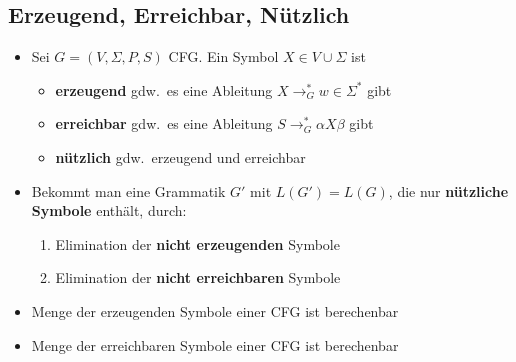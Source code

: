 \documentclass[ieeetran]{article}
\begin{document}
\subsection{Erzeugend, Erreichbar, Nützlich} %
\label{sub:erzeugend_erreichbar_nützlich}
\begin{itemize}
\item Sei $G = (V,\Sigma, P, S)$ CFG. Ein Symbol $X \in V \cup \Sigma$ ist
\begin{itemize}
\item \textbf{erzeugend} gdw.\ es eine Ableitung $X \rightarrow_G^* w \in \Sigma^*$ gibt
\item \textbf{erreichbar} gdw.\ es eine Ableitung $S \rightarrow_G^* \alpha X \beta$ gibt
  \item \textbf{nützlich} gdw.\ erzeugend und erreichbar


\end{itemize}

\item Bekommt man eine Grammatik $G'$ mit $L(G') = L(G)$, die nur \textbf{nützliche Symbole} enthält, durch:
	\begin{enumerate}
	  \item Elimination der \textbf{nicht erzeugenden} Symbole
\item Elimination der \textbf{nicht erreichbaren} Symbole
	\end{enumerate}

\item Menge der erzeugenden Symbole einer CFG ist berechenbar
\item Menge der erreichbaren Symbole einer CFG ist berechenbar
\end{itemize}
\end{document}

